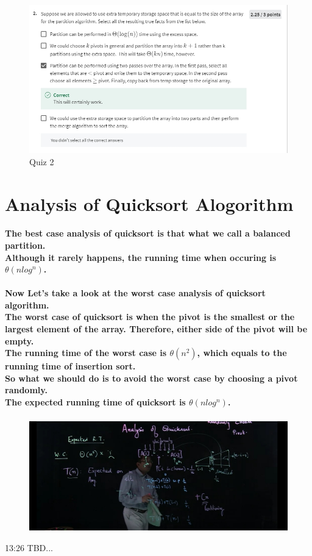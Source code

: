 \documentclass{article}
\begin{document}
\begin{figure}[H]
    \includegraphics[width=\textwidth]{week3lomutoquiz2.png}
    \caption{Quiz 2\\}
\end{figure}

\section{Analysis of Quicksort Alogorithm}

\paragraph{The best case analysis of quicksort is that what we call a balanced partition.\\
Although it rarely happens, the running time when occuring is $\theta(nlog^n)$.}

\paragraph{Now Let's take a look at the worst case analysis of quicksort algorithm.\\
The worst case of quicksort is when the pivot is the smallest or the largest element of 
the array. Therefore, either side of the pivot will be empty.\\
The running time of the worst case is $\theta(n^2)$, which equals to the running time of insertion sort.\\
So what we should do is to avoid the worst case by choosing a pivot randomly.\\
The expected running time of quicksort is $\theta(nlog^n)$.\\}

\begin{figure}[H]
    \includegraphics[width=\textwidth]{expectedaveragerunningtime.png}
\end{figure}

13:26 TBD...
\end{document}
